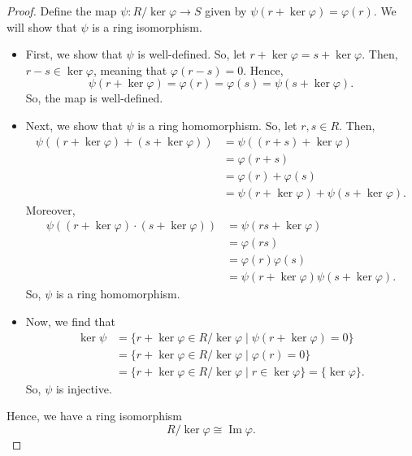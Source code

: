 \documentclass[a4paper, openany]{memoir}
\theoremstyle{definition}
\theoremstyle{plain}
\begin{document}
    \begin{proof}
        Define the map $\psi \colon R/\ker \varphi \to S$ given by $\psi(r + \ker \varphi) = \varphi(r)$. We will show that $\psi$ is a ring isomorphism.
        \begin{itemize}
            \item First, we show that $\psi$ is well-defined. So, let $r + \ker \varphi = s + \ker \varphi$. Then, $r - s \in \ker \varphi$, meaning that $\varphi(r - s) = 0$. Hence, 
            \[\psi(r + \ker \varphi) = \varphi(r) = \varphi(s) = \psi(s + \ker \varphi).\]
            So, the map is well-defined.

            \item Next, we show that $\psi$ is a ring homomorphism. So, let $r, s \in R$. Then, 
            \begin{align*}
                \psi((r + \ker \varphi) + (s + \ker \varphi)) &= \psi((r + s) + \ker \varphi) \\
                &= \varphi(r + s) \\
                &= \varphi(r) + \varphi(s) \\
                &= \psi(r + \ker \varphi) + \psi(s + \ker \varphi).
            \end{align*}
            Moreover,
            \begin{align*}
                \psi((r + \ker \varphi) \cdot (s + \ker \varphi)) &= \psi(rs + \ker \varphi) \\
                &= \varphi(rs) \\
                &= \varphi(r) \varphi(s) \\
                &= \psi(r + \ker \varphi) \psi(s + \ker \varphi).
            \end{align*}
            So, $\psi$ is a ring homomorphism.

            \item Now, we find that 
            \begin{align*}
                \ker \psi &= \{r + \ker \varphi \in R/\ker \varphi \mid \psi(r + \ker \varphi) = 0\} \\
                &= \{r + \ker \varphi \in R/\ker \varphi \mid \varphi(r) = 0\} \\
                &= \{r + \ker \varphi \in R/\ker \varphi \mid r \in \ker \varphi\} = \{\ker \varphi\}.
            \end{align*}
            So, $\psi$ is injective.
        \end{itemize}
        Hence, we have a ring isomorphism 
        \[R/\ker \varphi \cong \operatorname{Im} \varphi.\]
    \end{proof}
\end{document}
